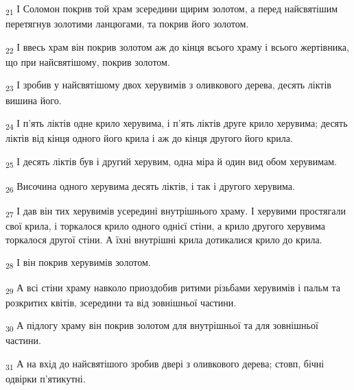 \begin{tcolorbox}
\textsubscript{21} І Соломон покрив той храм зсередини щирим золотом, а перед найсвятішим перетягнув золотими ланцюгами, та покрив його золотом.
\end{tcolorbox}
\begin{tcolorbox}
\textsubscript{22} І ввесь храм він покрив золотом аж до кінця всього храму і всього жертівника, що при найсвятішому, покрив золотом.
\end{tcolorbox}
\begin{tcolorbox}
\textsubscript{23} І зробив у найсвятішому двох херувимів з оливкового дерева, десять ліктів вишина його.
\end{tcolorbox}
\begin{tcolorbox}
\textsubscript{24} І п'ять ліктів одне крило херувима, і п'ять ліктів друге крило херувима; десять ліктів від кінця одного його крила і аж до кінця другого його крила.
\end{tcolorbox}
\begin{tcolorbox}
\textsubscript{25} І десять ліктів був і другий херувим, одна міра й один вид обом херувимам.
\end{tcolorbox}
\begin{tcolorbox}
\textsubscript{26} Височина одного херувима десять ліктів, і так і другого херувима.
\end{tcolorbox}
\begin{tcolorbox}
\textsubscript{27} І дав він тих херувимів усередині внутрішнього храму. І херувими простягали свої крила, і торкалося крило одного однієї стіни, а крило другого херувима торкалося другої стіни. А їхні внутрішні крила дотикалися крило до крила.
\end{tcolorbox}
\begin{tcolorbox}
\textsubscript{28} І він покрив херувимів золотом.
\end{tcolorbox}
\begin{tcolorbox}
\textsubscript{29} А всі стіни храму навколо приоздобив ритими різьбами херувимів і пальм та розкритих квітів, зсередини та від зовнішньої частини.
\end{tcolorbox}
\begin{tcolorbox}
\textsubscript{30} А підлогу храму він покрив золотом для внутрішньої та для зовнішньої частини.
\end{tcolorbox}
\begin{tcolorbox}
\textsubscript{31} А на вхід до найсвятішого зробив двері з оливкового дерева; стовп, бічні одвірки п'ятикутні.
\end{tcolorbox}
